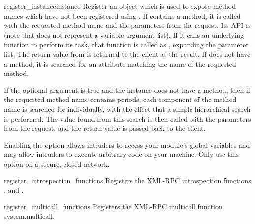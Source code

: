 \begin{methoddesc}[SimpleXMLRPCServer]{register_instance}{instance}
  Register an object which is used to expose method names which have
  not been registered using .  If
   contains a  method, it is called
  with the requested method name and the parameters from the request.  Its
  API is  (note that
   does not represent a variable argument list).  If it calls an
  underlying function to perform its task, that function is called as
  , expanding the parameter list.
  The return value from  is returned to the client as
  the result.  If
   does not have a  method, it is
  searched for an attribute matching the name of the requested method.

  If the optional  argument is true and the
  instance does not have a  method, then
  if the requested method name contains periods, each component of the
  method name is searched for individually, with the effect that a
  simple hierarchical search is performed.  The value found from this
  search is then called with the parameters from the request, and the
  return value is passed back to the client.

  \begin{notice}[warning]
  Enabling the  option allows intruders to access
  your module's global variables and may allow intruders to execute
  arbitrary code on your machine.  Only use this option on a secure,
  closed network.
  \end{notice}


\end{methoddesc}

\begin{methoddesc}{register_introspection_functions}{}
  Registers the XML-RPC introspection functions ,
   and . 
\end{methoddesc}

\begin{methoddesc}{register_multicall_functions}{}
  Registers the XML-RPC multicall function system.multicall.
\end{methoddesc}

